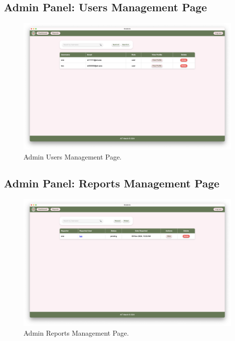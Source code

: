         \subsection{Admin Panel: Users Management Page}
        \begin{figure}[h]
                \centering
                \captionsetup{justification=centering, singlelinecheck=false, labelsep=space}
                \includegraphics[width=5in]{figures/results/admin/user-management.png} 
                \caption{Admin Users Management Page.}
                \label{fig:user-management}
            \end{figure}

        \subsection{Admin Panel: Reports Management Page}
        \begin{figure}[h]
                \centering
                \captionsetup{justification=centering, singlelinecheck=false, labelsep=space}
                \includegraphics[width=5in]{figures/results/admin/report-management.png}
                \caption{Admin Reports Management Page.}
                \label{fig:report-management}
            \end{figure}

            


